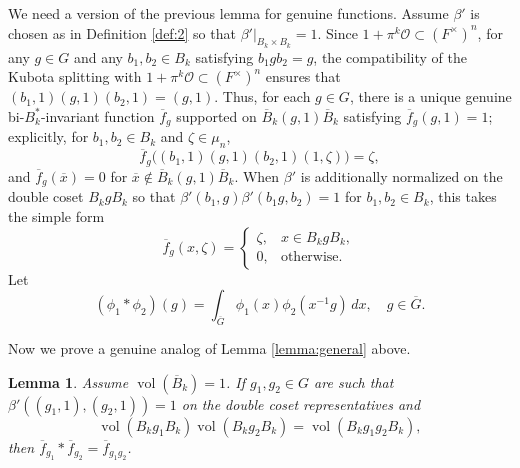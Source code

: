 \documentclass[12pt,letterpaper,reqno]{amsart}
\let\cal\mathcal
\newtheorem{lemma}[theorem]{Lemma}
\theoremstyle{definition}
\theoremstyle{remark}
\numberwithin{equation}{section}
\begin{document}
We need a version of the previous lemma for genuine functions. Assume $\beta'$
is chosen as in Definition \ref{def:2} so that $\beta'|_{B_k\times B_k}=1$.
Since $1+\pi^k{\cal O}\subset (F^\times)^n$, for any $g\in G$ and any
$b_1,b_2\in B_k$ satisfying $b_1 g b_2 = g$, the compatibility of the Kubota
splitting with $1+\pi^k{\cal O}\subset (F^\times)^n$ ensures that
$(b_1,1)(g,1)(b_2,1)=(g,1)$. Thus, for each $g\in G$, there is a unique
genuine bi-$B_k^*$-invariant function $\overline{f}_g$ supported on
$\overline{B}_k(g,1)\overline{B}_k$ satisfying $\overline{f}_g(g,1)=1$;
explicitly, for $b_1,b_2\in B_k$ and $\zeta\in\mu_n$,
\[
\overline{f}_g\bigl((b_1,1)(g,1)(b_2,1)(1,\zeta)\bigr)=\zeta,
\]
and $\overline{f}_g(\overline{x})=0$ for
$\overline{x}\notin \overline{B}_k(g,1)\overline{B}_k$. When $\beta'$ is
additionally normalized on the double coset $B_k g B_k$ so that
$\beta'(b_1,g)\beta'(b_1g,b_2)=1$ for $b_1,b_2\in B_k$, this takes the simple
form
\[
\overline{f}_{g}(x,\zeta)
=
\begin{cases}
\zeta, & x\in B_kgB_k,\\
0, & \text{otherwise}.
\end{cases}
\]
Let
\[
(\phi_1*\phi_2)(g)=
\int_{\overline{G}}\phi_1(x)\phi_2(x^{-1}g)\,dx,
\quad g\in \overline{G}.
\]

Now we prove a genuine analog of Lemma \ref{lemma:general} above.

\begin{lemma}
\label{lemma:genuine}
Assume $\operatorname{vol}(\overline{B}_k)=1$. If $g_1,g_2\in G$ are such that
$\beta'((g_1,1),(g_2,1))=1$ on the double coset representatives and
\[
\operatorname{vol}(B_kg_1B_k)
\operatorname{vol}(B_kg_2B_k)
=\operatorname{vol}(B_kg_1g_2B_k),
\]
then $\overline{f}_{g_1}*\overline{f}_{g_2}=\overline{f}_{g_1g_2}$.
\end{lemma}
\end{document}
